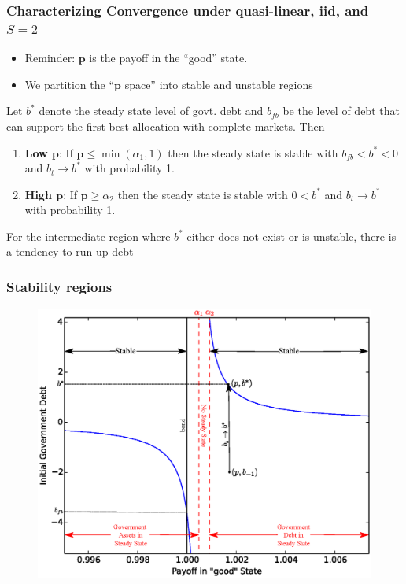 \documentclass{beamer}
\begin{document}
  \begin{frame}
  \frametitle{Characterizing Convergence under quasi-linear, iid, and $S=2$}

  \begin{itemize}
  \item Reminder:  $\bm{p}$ is the payoff in the ``good'' state.
   \item We partition  the ``$\bm{p}$ space'' into stable and unstable regions
     \end{itemize}

 	\begin{theorem}
Let $b^*$ denote the steady state level of govt.  debt and $b_{fb}$ be the level of debt that can support the first best allocation with complete markets.  Then %
		\begin{enumerate}
			\item  \textbf{Low $\bm{p}$}: If $\bm{p}\leq\min(\alpha_1,1)$ then the steady state is stable with $b_{fb}<b^*<0$ and $b_t\rightarrow b^*$ with probability 1.
			\item \textbf{High  $\bm{p}$}:  If $\bm{p} \geq \alpha_2$ then the steady state is stable with $0<b^*$ and $b_t \rightarrow b^*$ with probability 1.
			
			
			\end{enumerate}
			\end{theorem}
			
			For the intermediate region where  $b^*$ either does not exist or is unstable, there is a tendency to run up debt
		
		
	
 \end{frame}


\begin{frame}
   \frametitle{Stability regions}
	\begin{figure}
		\begin{center}
		\includegraphics[scale=.5]{Images/graph_stable.eps}
	\end{center}	
	\end{figure}

  \end{frame}
\end{document}
